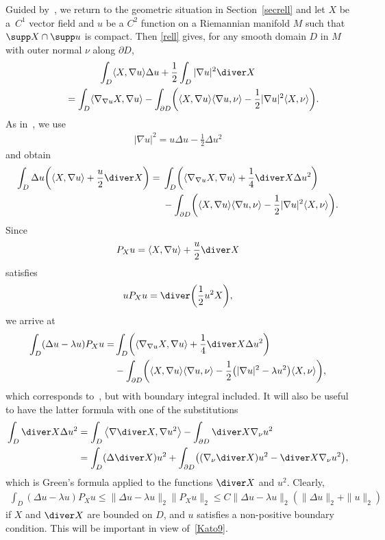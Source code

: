 Guided by~\cite[Section 3]{Xavier1988}, we return to the geometric situation in Section~\ref{secrell}
and let $X$ be a~$C^1$ vector field and $u$ be a $C^2$ function on a Riemannian manifold $M$
such that $\supp X\cap\supp u$ is compact.
Then \eqref{rell} gives, for any smooth domain $D$ in $M$ with outer normal $\nu$ along $\partial D$,
\begin{gather*}
 \int_D\langle X,\nabla u\rangle\Delta u + \frac12\int_D|\nabla u|^2\diver X \\
 \qquad\quad{}= \int_D\langle\nabla_{\nabla u}X,\nabla u\rangle
 - \int_{\partial D}\biggl(\langle X,\nabla u\rangle\langle\nabla u,\nu\rangle
 - \frac12|\nabla u|^2\langle X,\nu\rangle\biggr).
\end{gather*}
As in~\cite[p.~583]{Xavier1988}, we use
\begin{align*}
 |\nabla u|^2 = u\Delta u - \frac12\Delta u^2
\end{align*}
and obtain
\begin{align*}
 \int_D \Delta u\biggl(\langle X,\nabla u\rangle + \frac{u}2\diver X\biggr)
 = {}&\int_D \biggl(\langle\nabla_{\nabla u}X,\nabla u\rangle + \frac14\diver X\Delta u^2\biggr) \\
 &{}- \int_{\partial D}\biggl(\langle X,\nabla u\rangle\langle\nabla u,\nu\rangle
 - \frac12|\nabla u|^2\langle X,\nu\rangle\biggr).
\end{align*}
Since
\begin{align*}
 P_Xu = \langle X,\nabla u\rangle + \frac{u}2\diver X
\end{align*}
satisfies
\begin{align*}
 u P_Xu = \diver\biggl(\frac12u^2X\biggr),
\end{align*}
we arrive at
\begin{align}
 \int_D (\Delta u-\lambda u) P_Xu
 = &\int_D \biggl(\langle\nabla_{\nabla u}X,\nabla u\rangle + \frac14\diver X\Delta u^2\biggr) \notag\\
 &- \int_{\partial D}\biggl(\langle X,\nabla u\rangle\langle\nabla u,\nu\rangle
 - \frac12\bigl(|\nabla u|^2 - \lambda u^2\bigr)\langle X,\nu\rangle\biggr),\label{x1}
\end{align}
which corresponds to~\cite[identity~(2)]{Xavier1988}, but with boundary integral included.
It will also be useful to have the latter formula with one of the substitutions
\begin{align}
 \int_D\diver X\Delta u^2
 &= \int_D\big\langle\nabla\diver X,\nabla u^2\big\rangle - \int_{\partial D}\diver X\nabla_\nu u^2 \label{x2a}\\
 &= \int_D(\Delta\diver X)u^2
 + \int_{\partial D} \bigl((\nabla_\nu\diver X)u^2 - \diver X\nabla_\nu u^2\bigr), \nonumber%
\end{align}
which is Green's formula applied to the functions $\diver X$ and $u^2$.
Clearly,
\begin{gather}
 \int_D (\Delta u-\lambda u) P_Xu
	\le \|\Delta u-\lambda u\|_2\|P_Xu\|_2
	\le C\|\Delta u-\lambda u\|_2(\|\Delta u\|_2+\|u\|_2)\label{x3}
\end{gather}
if $X$ and $\diver X$ are bounded on $D$,
and $u$ satisfies a non-positive boundary condition.
This will be important in view of~\eqref{Kato9}.
